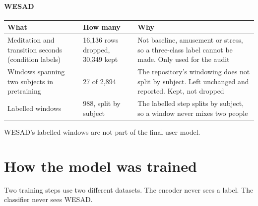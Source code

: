 \documentclass[11pt,a4paper]{article}
\begin{document}
\paragraph{WESAD}
\begin{table}[H]
\centering\footnotesize
\begin{tabularx}{\textwidth}{@{}YlY@{}}
\toprule
\textbf{What} & \textbf{How many} & \textbf{Why}\\
\midrule
Meditation and transition seconds (condition labels) & 16,136 rows dropped, 30,349 kept & Not baseline, amusement or stress, so a three-class label cannot be made. Only used for the audit\\
Windows spanning two subjects in pretraining & 27 of 2,894 & The repository's windowing does not split by subject. Left unchanged and reported. Kept, not dropped\\
Labelled windows & 988, split by subject & The labelled step splits by subject, so a window never mixes two people\\
\bottomrule
\end{tabularx}
\end{table}
WESAD's labelled windows are not part of the final user model.

\section{How the model was trained}
Two training steps use two different datasets. The encoder never sees a label. The classifier never
sees WESAD.
\end{document}
